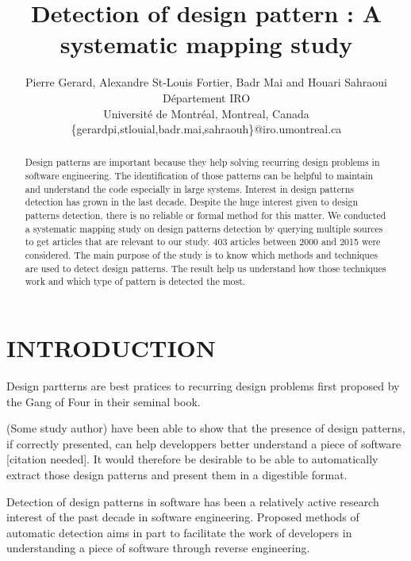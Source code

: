 \documentclass[letterpaper, 10 pt, conference]{ieeeconf}  %
\title{\LARGE \bf
Detection of design pattern : A systematic mapping study}
\author{Pierre Gerard, Alexandre St-Louis Fortier, Badr Mai and Houari Sahraoui \\
Département IRO \\
Université de Montréal, Montreal, Canada \\
\{gerardpi,stlouial,badr.mai,sahraouh\}@iro.umontreal.ca
}
\begin{document}
\maketitle
\thispagestyle{empty}
\pagestyle{empty}


\begin{abstract}

Design patterns are important because they help solving recurring design problems in software engineering. The identification of those patterns can be helpful to maintain and understand the code especially in large systems. Interest in design patterns detection has grown in the last decade. Despite the huge interest given to design patterns detection, there is no reliable or formal method for this matter.
We conducted a systematic mapping study on design patterns detection by querying multiple sources to get articles that are relevant to our study. 403 articles between 2000 and 2015 were considered.
The main purpose of the study is to know which methods and techniques are used to detect design patterns.
The result help us understand how those techniques work and which type of pattern is detected the most.



\end{abstract}


\section{INTRODUCTION}


Design partterns are best pratices to recurring design problems first proposed
by the Gang of Four in their seminal book.

(Some study author) have been able to show that the presence of design patterns,
if correctly presented, can help developpers better understand a piece of
software [citation needed].
It would therefore be desirable to be able to automatically extract those
design patterns and present them in a digestible format.

Detection of design patterns in software has been a relatively active research
interest of the past decade in software engineering.
Proposed methods of automatic detection aims in part to facilitate the work of
developers in understanding a piece of software through reverse engineering.
\end{document}
